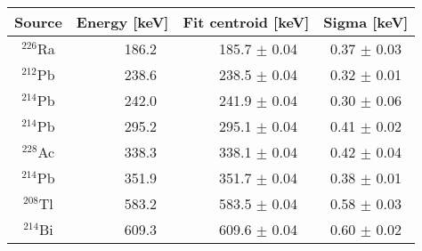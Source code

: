 				\begin{table}
					\centering
					\begin{tabular}{  c | r | r | c  }
					\hline
					{\bf Source} & {\bf Energy [keV]} & {\bf Fit centroid [keV]} & {\bf Sigma [keV]} \\  
					\hline
					$^{226}$Ra     & 186.2     ~ & 185.7      ${\pm}$ 0.04       ~ & 0.37       ${\pm}$ 0.03       \\
					$^{212}$Pb     & 238.6     ~ & 238.5      ${\pm}$ 0.04       ~ & 0.32       ${\pm}$ 0.01       \\
					$^{214}$Pb     & 242.0     ~ & 241.9      ${\pm}$ 0.04       ~ & 0.30       ${\pm}$ 0.06       \\
					$^{214}$Pb     & 295.2     ~ & 295.1      ${\pm}$ 0.04       ~ & 0.41       ${\pm}$ 0.02       \\
					$^{228}$Ac     & 338.3     ~ & 338.1      ${\pm}$ 0.04       ~ & 0.42       ${\pm}$ 0.04       \\
					$^{214}$Pb     & 351.9     ~ & 351.7      ${\pm}$ 0.04       ~ & 0.38       ${\pm}$ 0.01       \\
					$^{208}$Tl     & 583.2     ~ & 583.5      ${\pm}$ 0.04       ~ & 0.58       ${\pm}$ 0.03       \\
					$^{214}$Bi     & 609.3     ~ & 609.6      ${\pm}$ 0.04       ~ & 0.60       ${\pm}$ 0.02       \\

\end{tabular}
\end{table}
